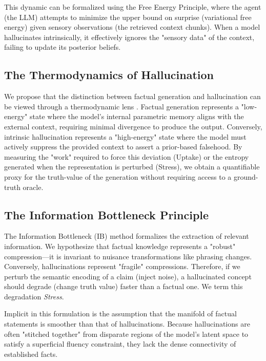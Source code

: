 \documentclass[11pt,letterpaper]{article}
\begin{document}
This dynamic can be formalized using the Free Energy Principle, where the agent (the LLM) attempts to minimize the upper bound on surprise (variational free energy) given sensory observations (the retrieved context chunks). When a model hallucinates intrinsically, it effectively ignores the "sensory data" of the context, failing to update its posterior beliefs.

\subsection{The Thermodynamics of Hallucination}
We propose that the distinction between factual generation and hallucination can be viewed through a thermodynamic lens . Factual generation represents a "low-energy" state where the model's internal parametric memory aligns with the external context, requiring minimal divergence to produce the output. Conversely, intrinsic hallucination represents a "high-energy" state where the model must actively suppress the provided context to assert a prior-based falsehood. By measuring the "work" required to force this deviation (Uptake) or the entropy generated when the representation is perturbed (Stress), we obtain a quantifiable proxy for the truth-value of the generation without requiring access to a ground-truth oracle.

\subsection{The Information Bottleneck Principle}
The Information Bottleneck (IB) method formalizes the extraction of relevant information. We hypothesize that factual knowledge represents a "robust" compression—it is invariant to nuisance transformations like phrasing changes. Conversely, hallucinations represent "fragile" compressions. Therefore, if we perturb the semantic encoding of a claim (inject noise), a hallucinated concept should degrade (change truth value) faster than a factual one. We term this degradation \textit{Stress}.

Implicit in this formulation is the assumption that the manifold of factual statements is smoother than that of hallucinations. Because hallucinations are often "stitched together" from disparate regions of the model's latent space to satisfy a superficial fluency constraint, they lack the dense connectivity of established facts.

\end{document}
